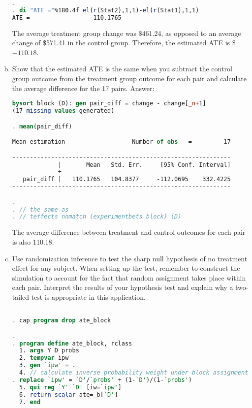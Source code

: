 \documentclass[11pt,notitlepage]{article}\usepackage[]{graphicx}\usepackage[]{color}
\begin{document}
\begin{enumerate}[a)]
\begin{lstlisting}[language=stata]
. 
. di "ATE ="%180.4f el(r(Stat2),1,1)-el(r(Stat1),1,1)
ATE =                 -110.1765


\end{lstlisting}


The average treatment group change was \$461.24, as opposed to an average change of \$571.41 in the control group.  Therefore, the estimated ATE is \$\ensuremath{-110.18}.
\item Show that the estimated ATE is the same when you subtract the control group outcome from the treatment group outcome for each pair and calculate the average difference for the 17 pairs. 
Answer:\\

\begin{lstlisting}[language=stata]
 bysort block (D): gen pair_diff = change - change[_n+1]
(17 missing values generated)

. mean(pair_diff)

Mean estimation                   Number of obs   =         17

--------------------------------------------------------------
             |       Mean   Std. Err.     [95% Conf. Interval]
-------------+------------------------------------------------
   pair_diff |   110.1765   104.8377     -112.0695    332.4225
--------------------------------------------------------------

. 
. // the same as
. // teffects nnmatch (experimentbets block) (D)

\end{lstlisting}

The average difference between treatment and control outcomes for each pair is also 110.18.

\item Use randomization inference to test the sharp null hypothesis of no treatment effect for any subject.  When setting up the test, remember to construct the simulation to account for the fact that random assignment takes place within each pair.  Interpret the results of your hypothesis test and explain why a two-tailed test is appropriate in this application.

\begin{lstlisting}[language=stata]

. cap program drop ate_block

. 
. program define ate_block, rclass
  1. args Y D probs
  2. tempvar ipw
  3. gen `ipw' = .
  4. // calculate inverse probability weight under block assignment
. replace `ipw' = `D'/`probs' + (1-`D')/(1-`probs')
  5. qui reg `Y' `D' [iw=`ipw']
  6. return scalar ate=_b[`D']
  7. end 


\end{lstlisting}
\end{enumerate}
\end{document}
